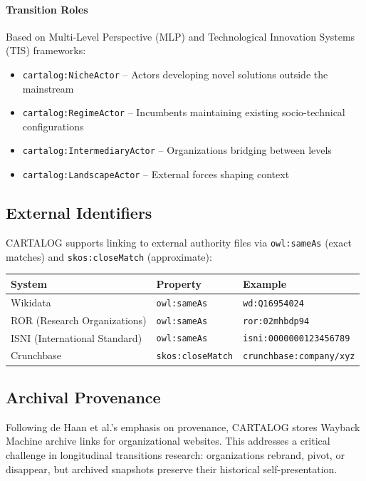 \documentclass[../main.tex]{subfiles}
\begin{document}
\paragraph{Transition Roles} Based on Multi-Level Perspective (MLP) and Technological Innovation Systems (TIS) frameworks:
\begin{itemize}[leftmargin=*, itemsep=0.1em]
\item \texttt{cartalog:NicheActor} -- Actors developing novel solutions outside the mainstream
\item \texttt{cartalog:RegimeActor} -- Incumbents maintaining existing socio-technical configurations
\item \texttt{cartalog:IntermediaryActor} -- Organizations bridging between levels
\item \texttt{cartalog:LandscapeActor} -- External forces shaping context
\end{itemize}

\subsection{External Identifiers}

\textsc{CARTALOG} supports linking to external authority files via \texttt{owl:sameAs} (exact matches) and \texttt{skos:closeMatch} (approximate):

\tableminimal
\begin{center}
\begin{tabular}{@{}lll@{}}
\toprule
\textbf{System} & \textbf{Property} & \textbf{Example} \\
\midrule
Wikidata & \texttt{owl:sameAs} & \texttt{wd:Q16954024} \\
ROR (Research Organizations) & \texttt{owl:sameAs} & \texttt{ror:02mhbdp94} \\
ISNI (International Standard) & \texttt{owl:sameAs} & \texttt{isni:0000000123456789} \\
Crunchbase & \texttt{skos:closeMatch} & \texttt{crunchbase:company/xyz} \\
\bottomrule
\end{tabular}
\end{center}

\subsection{Archival Provenance}

Following de Haan et al.'s emphasis on provenance, \textsc{CARTALOG} stores Wayback Machine archive links for organizational websites. This addresses a critical challenge in longitudinal transitions research: organizations rebrand, pivot, or disappear, but archived snapshots preserve their historical self-presentation.
\end{document}
